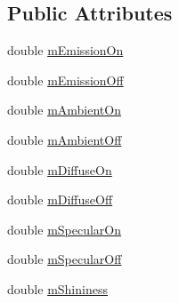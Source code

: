 \subsection*{Public Attributes}
\begin{DoxyCompactItemize}
\item 
double \hyperlink{class_electric_material_data_ad0b9e1983b34e1995d0c662007b5b773}{m\-Emission\-On}
\item 
double \hyperlink{class_electric_material_data_a7463eb3c1e7839a5be7afca67191e405}{m\-Emission\-Off}
\item 
double \hyperlink{class_electric_material_data_a5251ccabe0243a8c8a783c1e105bd151}{m\-Ambient\-On}
\item 
double \hyperlink{class_electric_material_data_ac403298c9ad462c7722aa6ecf5078a26}{m\-Ambient\-Off}
\item 
double \hyperlink{class_electric_material_data_a142f858836d56cdfd13eff14aaea6e89}{m\-Diffuse\-On}
\item 
double \hyperlink{class_electric_material_data_ae26b6c78ca76ba31c349a8c17fc44989}{m\-Diffuse\-Off}
\item 
double \hyperlink{class_electric_material_data_a57d818c17fc37e8e44871f1310d84a1c}{m\-Specular\-On}
\item 
double \hyperlink{class_electric_material_data_aba5b236744527ecb0c3a391967b87575}{m\-Specular\-Off}
\item 
double \hyperlink{class_electric_material_data_aa6e7cc7da2cece949af3e9907eeaf98d}{m\-Shininess}
\end{DoxyCompactItemize}


